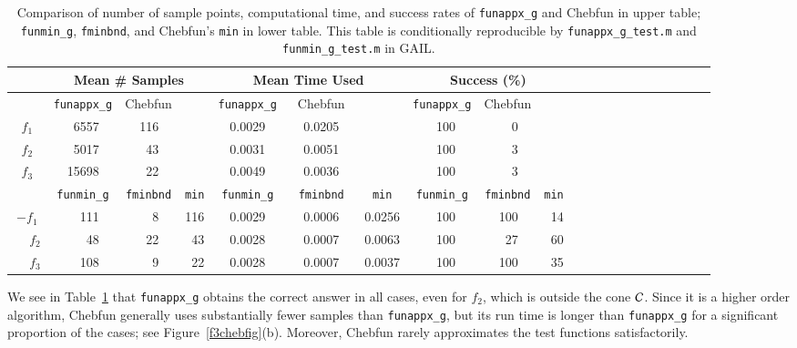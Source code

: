 \documentclass[review]{elsarticle}
\theoremstyle{definition}
\newcommand{\funappxg}{\texttt{funappx\_g}\xspace}
\newcommand{\funappxglobalg}{\texttt{funappxglobal\_g}\xspace}
\newcommand{\funming}{\texttt{funmin\_g}\xspace}
\newcommand{\fminbnd}{\texttt{fminbnd}\xspace}
\begin{document}
%
\begin{table}[bt]
	\centering
	\caption{Comparison of number of sample points, computational time,  and success
		rates of \funappxg  %
		and Chebfun in upper table;
		\funming, \fminbnd, and Chebfun's \texttt{min} in lower table.
		This table is conditionally reproducible by
		\texttt{funappx\_g\_test.m} and \texttt{funmin\_g\_test.m}  in
		GAIL.\label{tab:localVsGlobalVsChebfun}}
	\medskip
	{\footnotesize
		\setlength{\tabcolsep}{0.35em} %
		\begin{tabular}{crrrrrrrrrrrrrrrrrrrrrrrrrrrrrrrr}	
			\toprule	
			& \multicolumn{7}{c}{\bf Mean \# Samples}
			& \multicolumn{7}{c}{\bf Mean Time Used}
			& \multicolumn{7}{c}{\bf Success (\%)}
			\\ \midrule
			&
			\multicolumn{3}{c}{\funappxg}  & \multicolumn{3}{c}{Chebfun} &&
			\multicolumn{3}{c}{\funappxg}  &  \multicolumn{3}{c}{Chebfun} &&
			\multicolumn{3}{c}{\funappxg}  &   \multicolumn{3}{c}{Chebfun}
			\\ \toprule
			$f_1$  &&
			6557 &&& 116  &&&&	0.0029  &&& 0.0205  &&&& 100  &&& 0
			\\
			$f_2$  &&
			5017  &&&  43 &&&&  0.0031  &&& 0.0051 &&&& 100  &&& 3
			\\
			$f_3$  &&
			15698 &&& 22  &&&& 0.0049  &&& 0.0036  &&&& 100  &&&  3 	
			\\ \bottomrule
			 &
			\multicolumn{3}{c}{\funming} &  \multicolumn{3}{c}{\fminbnd}  &
			\multicolumn{1}{c}{\texttt{min}} &
			\multicolumn{3}{c}{\funming}  &  \multicolumn{3}{c}{\fminbnd }  &
			\multicolumn{1}{c}{\texttt{min} }  &
			\multicolumn{3}{c}{\funming} & \multicolumn{3}{c}{\fminbnd} &
			\multicolumn{1}{c}{\texttt{min}}
			\\ \toprule
			$-f_1$   &&
			111&&&  8 && 116 &&  0.0029 &&& 0.0006 && 0.0256 &&
			100 &&& 100 && 14
			\\ $\phantom{-}f_2$ &&
			48 &&& 22 && 43 && 0.0028 &&& 0.0007 && 0.0063 &&
			100 &&& 27 && 60
			\\ $\phantom{-}f_3$ &&
			108 &&& 9 && 22 && 0.0028 &&& 0.0007 && 0.0037 &&
			100 &&&  100 && 35
			\\ \bottomrule
		\end{tabular}
	}
\end{table}


%

We see in Table~\ref{tab:localVsGlobalVsChebfun} that \funappxg{} obtains
the correct answer in all cases,
even for $f_2$, which is outside the cone $\mathcal{C}$. Since it is a higher order algorithm,
Chebfun generally uses substantially fewer samples than
\funappxg, but its run time is longer than \funappxg for a
significant proportion of the cases; see Figure~\ref{f3chebfig}(b). Moreover, Chebfun
rarely approximates the test functions satisfactorily.
\end{document}
